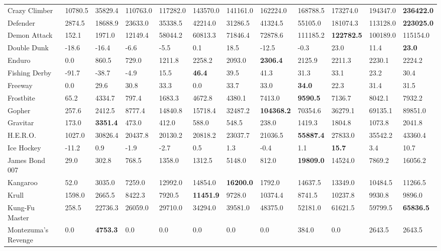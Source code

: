\begin{tabular}{| p{2.4cm} p{0.84cm} p{0.84cm} p{0.84cm} p{0.84cm} p{0.84cm} p{0.84cm} p{0.84cm} p{0.84cm} p{0.84cm} p{0.84cm} p{0.84cm} |}
Crazy Climber & 10780.5 & 35829.4 & 110763.0 & 117282.0 & 143570.0 & 141161.0 & 162224.0 & 168788.5 & 173274.0 & 194347.0 & {\bf 236422.0}\\
Defender & 2874.5 & 18688.9 & 23633.0 & 35338.5 & 42214.0 & 31286.5 & 41324.5 & 55105.0 & 181074.3 & 113128.0 & {\bf 223025.0}\\
Demon Attack & 152.1 & 1971.0 & 12149.4 & 58044.2 & 60813.3 & 71846.4 & 72878.6 & 111185.2 & {\bf 122782.5} & 100189.0 & 115154.0\\
Double Dunk & -18.6 & -16.4 & -6.6 & -5.5 & 0.1 & 18.5 & -12.5 & -0.3 & 23.0 & 11.4 & {\bf 23.0}\\
Enduro & 0.0 & 860.5 & 729.0 & 1211.8 & 2258.2 & 2093.0 & {\bf 2306.4} & 2125.9 & 2211.3 & 2230.1 & 2224.2\\
Fishing Derby & -91.7 & -38.7 & -4.9 & 15.5 & {\bf 46.4} & 39.5 & 41.3 & 31.3 & 33.1 & 23.2 & 30.4\\
Freeway & 0.0 & 29.6 & 30.8 & 33.3 & 0.0 & 33.7 & 33.0 & {\bf 34.0} & 22.3 & 31.4 & 31.5\\
Frostbite & 65.2 & 4334.7 & 797.4 & 1683.3 & 4672.8 & 4380.1 & 7413.0 & {\bf 9590.5} & 7136.7 & 8042.1 & 7932.2\\
Gopher & 257.6 & 2412.5 & 8777.4 & 14840.8 & 15718.4 & 32487.2 & {\bf 104368.2} & 70354.6 & 36279.1 & 69135.1 & 89851.0\\
Gravitar & 173.0 & {\bf 3351.4} & 473.0 & 412.0 & 588.0 & 548.5 & 238.0 & 1419.3 & 1804.8 & 1073.8 & 2041.8\\
H.E.R.O. & 1027.0 & 30826.4 & 20437.8 & 20130.2 & 20818.2 & 23037.7 & 21036.5 & {\bf 55887.4} & 27833.0 & 35542.2 & 43360.4\\
Ice Hockey & -11.2 & 0.9 & -1.9 & -2.7 & 0.5 & 1.3 & -0.4 & 1.1 & {\bf 15.7} & 3.4 & 10.7\\
James Bond 007 & 29.0 & 302.8 & 768.5 & 1358.0 & 1312.5 & 5148.0 & 812.0 & {\bf 19809.0} & 14524.0 & 7869.2 & 16056.2\\
Kangaroo & 52.0 & 3035.0 & 7259.0 & 12992.0 & 14854.0 & {\bf 16200.0} & 1792.0 & 14637.5 & 13349.0 & 10484.5 & 11266.5\\
Krull & 1598.0 & 2665.5 & 8422.3 & 7920.5 & {\bf 11451.9} & 9728.0 & 10374.4 & 8741.5 & 10237.8 & 9930.8 & 9896.0\\
Kung-Fu Master & 258.5 & 22736.3 & 26059.0 & 29710.0 & 34294.0 & 39581.0 & 48375.0 & 52181.0 & 61621.5 & 59799.5 & {\bf 65836.5}\\
Montezuma's Revenge & 0.0 & {\bf 4753.3} & 0.0 & 0.0 & 0.0 & 0.0 & 0.0 & 384.0 & 0.0 & 2643.5 & 2643.5\\

\end{tabular}
